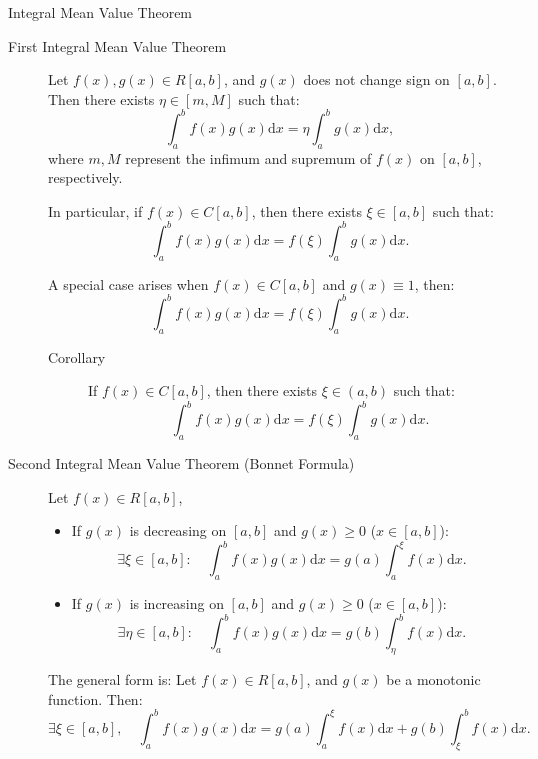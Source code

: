 \documentclass[11pt]{../../TexTemplate/elegantbook}
\begin{document}
\begin{theorem}{Integral Mean Value Theorem}
    \begin{description}
        \item[First Integral Mean Value Theorem ] Let \( f(x), g(x) \in R[a, b] \), 
            and \( g(x) \) does not change sign on \( [a, b] \). Then there exists \( \eta \in [m, M] \) such that:
            \[
            \int_{a}^b f(x)g(x) \mathrm{d}x = \eta \int_{a}^b g(x) \mathrm{d}x,
            \]
            where \( m, M \) represent the infimum and supremum of \( f(x) \) on \( [a, b] \), respectively.

            In particular, if \( f(x) \in C[a, b] \), then there exists \( \xi \in [a, b] \) such that:
            \[
            \int_{a}^b f(x)g(x) \mathrm{d}x = f(\xi) \int_{a}^b g(x) \mathrm{d}x.
            \]

            A special case arises when \( f(x) \in C[a, b] \) and \( g(x) \equiv 1 \), then:
            \[
            \int_{a}^{b} f(x)g(x) \mathrm{d}x = f(\xi) \int_{a}^{b} g(x) \mathrm{d}x.
            \]
            \begin{description}
                \item[Corollary] If \( f(x) \in C[a, b] \), then there exists \( \xi \in (a, b) \) such that:
                    \[
                    \int_{a}^b f(x)g(x) \mathrm{d}x = f(\xi) \int_{a}^b g(x) \mathrm{d}x.
                    \]
            \end{description} 
        \item[Second Integral Mean Value Theorem (Bonnet Formula)] Let \( f(x) \in R[a, b] \),
            \begin{itemize}
            \item If \( g(x) \) is decreasing on \( [a, b] \) and \( g(x) \geqslant 0 \) (\( x \in [a, b] \)):
            \[
            \exists \xi \in [a, b]: \quad \int_{a}^{b} f(x)g(x) \mathrm{d}x = g(a)\int_{a}^{\xi} f(x) \mathrm{d}x.
            \]
            \item If \( g(x) \) is increasing on \( [a, b] \) and \( g(x) \geqslant 0 \) (\( x \in [a, b] \)):
            \[
            \exists \eta \in [a, b]: \quad \int_{a}^{b} f(x)g(x) \mathrm{d}x = g(b)\int_{\eta}^{b} f(x) \mathrm{d}x.
            \]
            \end{itemize}
            The general form is:
            Let \( f(x) \in R[a, b] \), and \( g(x) \) be a monotonic function. Then:
            \[
            \exists \xi \in [a, b], \quad \int_{a}^{b} f(x)g(x) \mathrm{d}x = g(a)\int_{a}^{\xi} f(x) \mathrm{d}x + g(b)\int_{\xi}^{b} f(x) \mathrm{d}x.
            \]
    \end{description}
\end{theorem}
\end{document}
